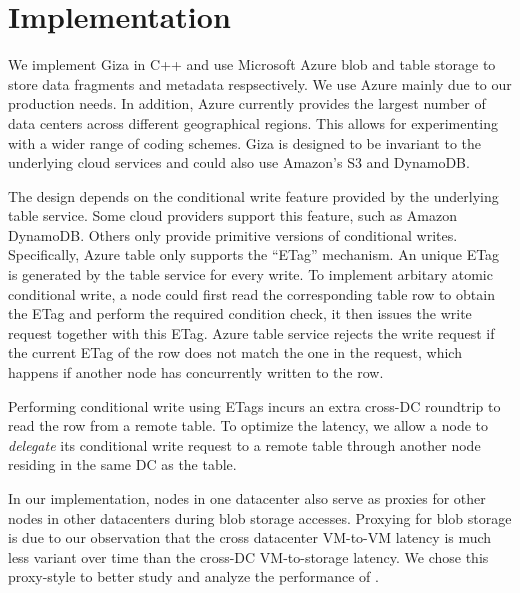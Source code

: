 \section{Implementation}
\label{sec:impl}

We implement Giza in C++ and use Microsoft Azure blob and table storage to store data fragments and metadata respsectively. We use Azure mainly 
due to our production needs. In addition, Azure currently provides the largest number 
of data centers across different geographical regions. This allows for experimenting 
with a wider range of coding schemes. Giza is designed to be invariant to the 
underlying cloud services and could also use Amazon's S3 and DynamoDB. 

The \name design depends on the conditional write feature provided by the underlying 
table service. Some cloud providers support this feature, such as Amazon DynamoDB.
Others only provide primitive versions of conditional writes. Specifically, 
Azure table only supports the ``ETag'' mechanism. An unique ETag 
is generated by the table service for every write.  To implement arbitary atomic
conditional write, a \name node could first read the corresponding table row to
obtain the ETag and perform the required condition check, it then issues the
write request together with this ETag.  Azure table service rejects the
write request if the current ETag of the row does not match the one in the
request, which happens if another \name node has concurrently written to the row.  

Performing conditional write using ETags 
incurs an extra cross-DC roundtrip to read the row from a remote table.
To optimize the latency, we allow a \name node to \emph{delegate} its 
conditional write request to a remote table through another node 
residing in the same DC as the table.

In our implementation, \name nodes in one datacenter also serve as proxies for
other nodes in other datacenters during blob storage accesses.  Proxying for
blob storage is due to our observation that the cross datacenter VM-to-VM
latency is much less variant over time than the cross-DC VM-to-storage latency.
We chose this proxy-style to better study and analyze the performance of \name.


